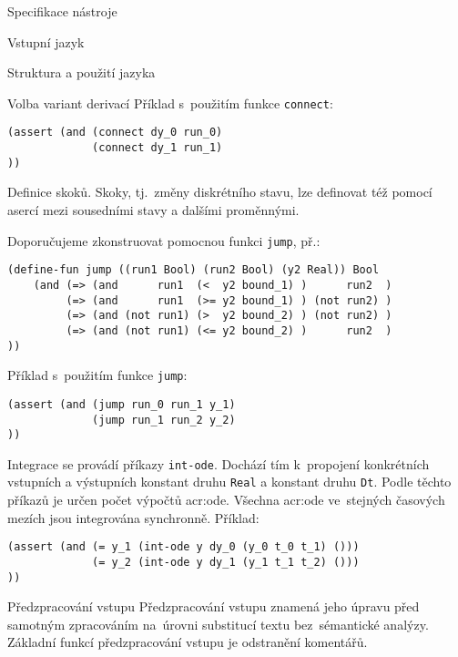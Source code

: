 \documentclass[thesis=M,czech]{FITthesis}[2012/06/26]
\newcommand{\acrlabel}[1]{acr:#1}
\newcommand{\acr}[1]{\acrshort{\acrlabel{#1}}}
\newcommand{\id}[1]{\texttt{#1}}
\begin{document}
\begin{section}{Specifikace nástroje}
\begin{subsection}{Vstupní jazyk}
\begin{subsubsection}{Struktura a použití jazyka}
\begin{paragraph}{Volba variant derivací}
Příklad s~použitím funkce \id{connect}:
\begin{verbatim}
(assert (and (connect dy_0 run_0)
             (connect dy_1 run_1)
))
\end{verbatim}
\end{paragraph} %


\begin{paragraph}{Definice skoků.}\label{p:design:spec:ilang:struct:jump}
Skoky, tj.~změny diskrétního stavu,
lze definovat též pomocí asercí
mezi sousedními stavy a dalšími proměnnými.

Doporučujeme zkonstruovat pomocnou funkci \id{jump}, př.:
\begin{verbatim}
(define-fun jump ((run1 Bool) (run2 Bool) (y2 Real)) Bool
    (and (=> (and      run1  (<  y2 bound_1) )      run2  )
         (=> (and      run1  (>= y2 bound_1) ) (not run2) )
         (=> (and (not run1) (>  y2 bound_2) ) (not run2) )
         (=> (and (not run1) (<= y2 bound_2) )      run2  )
))
\end{verbatim}

Příklad s~použitím funkce \id{jump}:
\begin{verbatim}
(assert (and (jump run_0 run_1 y_1)
             (jump run_1 run_2 y_2)
))
\end{verbatim}
\end{paragraph} %


\begin{paragraph}{Integrace}\label{p:design:spec:ilang:struct:int}
se provádí příkazy \id{int\--ode}.
Dochází tím k~propojení konkrétních vstupních a výstupních konstant
druhu \id{Real} a konstant druhu \id{Dt}.
Podle těchto příkazů je určen počet výpočtů \acr{ode}.
Všechna \acr{ode} ve~stejných časových mezích jsou
integrována synchronně.
Příklad:
\begin{verbatim}
(assert (and (= y_1 (int-ode y dy_0 (y_0 t_0 t_1) ()))
             (= y_2 (int-ode y dy_1 (y_1 t_1 t_2) ()))
))
\end{verbatim}
\end{paragraph} %


\end{subsubsection} %


\begin{subsubsection}{Předzpracování vstupu}
\label{sss:design:spec:ilang:macros}
Předzpracování vstupu znamená jeho úpravu
před samotným zpracováním
na~úrovni substitucí textu bez~sémantické analýzy.
Základní funkcí předzpracování vstupu je odstranění komentářů.


\end{subsubsection}
\end{subsection}
\end{section}
\end{document}
